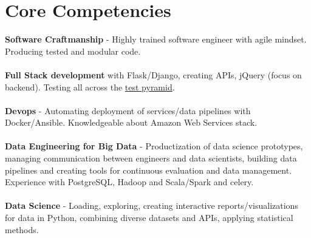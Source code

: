 \documentclass[10pt]{article} %
\begin{document}
\begin{minipage}[t]{0.44\textwidth}
\section{Core Competencies} 
    \normalsize{\textbf{Software Craftmanship} - Highly trained software engineer with agile mindset. Producing tested and modular code. }\\
    \\
    \normalsize{\textbf{Full Stack development} with Flask/Django, creating APIs, jQuery (focus on backend). Testing all across  the \href{https://martinfowler.com/articles/practical-test-pyramid.html}{test pyramid}. }\\
\\
\normalsize{\textbf{Devops} - Automating deployment of services/data pipelines with Docker/Ansible. Knowledgeable about Amazon Web Services stack. }\\
\\
    \normalsize{\textbf{Data Engineering for Big Data} - Productization of data science prototypes, managing communication between engineers and data scientists, building data pipelines and creating tools for continuous evaluation and data management. Experience with PostgreSQL, Hadoop and Scala/Spark and celery. }\\
\\
    \normalsize{\textbf{Data Science} - Loading, exploring, creating interactive reports/visualizations for data in Python, combining diverse datasets and APIs, applying statistical methods.}\\




\end{minipage}
\end{document}
